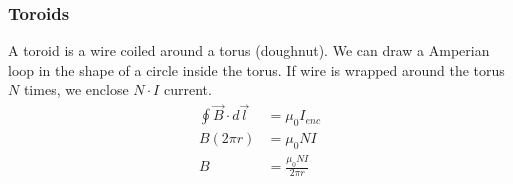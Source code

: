 \documentclass[12pt, titlepage]{article}
\begin{document}
\subsubsection*{Toroids}

A toroid is a wire coiled around a torus (doughnut). We can draw a Amperian loop in the shape of a circle inside the torus. If wire is wrapped around the torus $N$ times, we enclose $N \cdot I$ current.
\begin{align*}
    \oint \vec{B} \cdot d\vec{l} &= \mu_0I_{enc} \\
    B(2 \pi r) &= \mu_0NI \\
    B &= \boxed{\frac{\mu_0NI}{2 \pi r}}
\end{align*}
\end{document}
